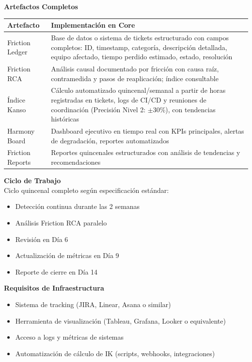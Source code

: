 \textbf{Artefactos Completos}
\begin{center}
\small
\begin{tabular}{|p{4cm}|p{9cm}|}
\hline
\textbf{Artefacto} & \textbf{Implementación en Core} \\ \hline
Friction Ledger & Base de datos o sistema de tickets estructurado con campos completos: ID, timestamp, categoría, descripción detallada, equipo afectado, tiempo perdido estimado, estado, resolución \\ \hline
Friction RCA & Análisis causal documentado por fricción con causa raíz, contramedida y pasos de reaplicación; índice consultable \\ \hline
Índice Kanso & Cálculo automatizado quincenal/semanal a partir de horas registradas en tickets, logs de CI/CD y reuniones de coordinación (Precisión Nivel 2: $\pm$30\%), con tendencias históricas \\ \hline
Harmony Board & Dashboard ejecutivo en tiempo real con KPIs principales, alertas de degradación, reportes automatizados \\ \hline
Friction Reports & Reportes quincenales estructurados con análisis de tendencias y recomendaciones \\ \hline
\end{tabular}
\end{center}

\textbf{Ciclo de Trabajo}\\
Ciclo quincenal completo según especificación estándar:
\begin{itemize}
    \item Detección continua durante las 2 semanas
    \item Análisis Friction RCA paralelo
    \item Revisión en Día 6
    \item Actualización de métricas en Día 9
    \item Reporte de cierre en Día 14
\end{itemize}

\textbf{Requisitos de Infraestructura}
\begin{itemize}
    \item Sistema de tracking (JIRA, Linear, Asana o similar)
    \item Herramienta de visualización (Tableau, Grafana, Looker o equivalente)
    \item Acceso a logs y métricas de sistemas
    \item Automatización de cálculo de IK (scripts, webhooks, integraciones)
\end{itemize}

